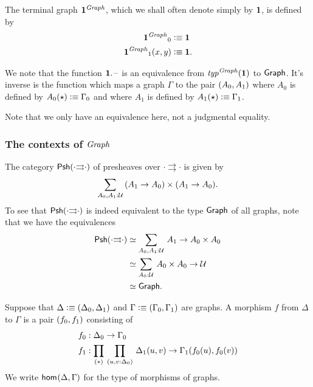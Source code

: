 \begin{defn}
The terminal graph $\mathbf{1}^\mathit{Graph}$, which we shall often denote simply 
by $\mathbf{1}$, is defined by
\begin{align*}
{\unit^\mfGraph}_0 & \defeq \unit\\
{\unit^\mfGraph}_1(x,y) & \defeq \unit.
\end{align*}
\end{defn}

\begin{rmk}
We note that the function $\ctxext{\unit}{\blank}$ is an equivalence
from ${{\mathit{typ}^{\mathit{Graph}}}(\mathbf{1})}$ to $\mathsf{Graph}$. It's inverse is the function which maps
a graph $\Gamma$ to the pair ${\mathopen{}(A_0,A_1)\mathclose{}}$ where $A_0$ is defined by
$A_0(\star)\vcentcolon\equiv\Gamma_0$ and where $A_1$ is defined by $A_1(\star)\vcentcolon\equiv
\Gamma_1$. 

Note that we only have an equivalence here, not a judgmental equality.
\end{rmk}

\subsubsection{The contexts of $\mathit{Graph}$}


The category $\mathsf{Psh}(\cdot{\rightrightarrows}\cdot)$ of presheaves over
$\cdot{\rightrightarrows}\cdot$ is given by
\begin{equation*}
\sm{A_0,A_1:\type}(A_1\to A_0)\times(A_1\to A_0).
\end{equation*}
To see that $\mathsf{Psh}(\cdot{\rightrightarrows}\cdot)$ is indeed equivalent to
the type $\mathsf{Graph}$ of all graphs, note that we have the equivalences
\begin{align*}
\psh(\cdot{\rightrightarrows}\cdot) & \eqvsym \sm{A_0,A_1:\type}A_1\to A_0\times A_0\\
& \eqvsym \sm{A_0:\type} A_0\times A_0\to\type\\
& \eqvsym \tfGraph.
\end{align*}

\begin{defn}
Suppose that $\Delta\vcentcolon\equiv {\mathopen{}(\Delta_0,\Delta_1)\mathclose{}}$ and $\Gamma\vcentcolon\equiv {\mathopen{}(\Gamma_0,
\Gamma_1)\mathclose{}}$ are graphs. A morphism $f$ from $\Delta$ to $\Gamma$ is a pair
${\mathopen{}(f_0,f_1)\mathclose{}}$ consisting of
\begin{align*}
f_0 & : \Delta_0\to\Gamma_0\\
f_1 & : \prd*{u,v:\Delta_0}\Delta_1(u,v)\to\Gamma_1(f_0(u),f_0(v))
\end{align*}
We write $\mathsf{hom}_{}(\Delta,\Gamma)$ for the type of morphisms of graphs.
\end{defn}

